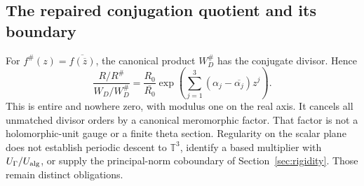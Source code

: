\subsection{The repaired conjugation quotient and its boundary}
For $f^\#(z)=\overline{f(\overline z)}$, the canonical product $W_D^\#$ has the conjugate divisor. Hence
\begin{equation}\label{eq:regularized-conjugation}
 \frac{R/R^\#}{W_D/W_D^\#}
 =\frac{R_0}{\overline{R_0}}
 \exp\left(\sum_{j=1}^{3}(\alpha_j-\overline{\alpha_j})z^j\right).
\end{equation}
This is entire and nowhere zero, with modulus one on the real axis. It cancels all unmatched divisor orders by a canonical meromorphic factor. That factor is not a holomorphic-unit gauge or a finite theta section. Regularity on the scalar plane does not establish periodic descent to $\mathbb T^3$, identify a based multiplier with $U_\Gamma/U_{\rm alg}$, or supply the principal-norm coboundary of Section~\ref{sec:rigidity}. Those remain distinct obligations.
